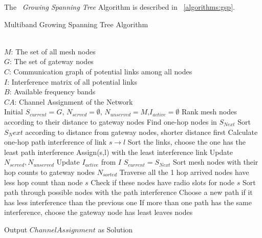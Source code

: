 The ~\emph{Growing Spanning Tree} Algorithm is described in ~\ref{algorithms:gsp}.







\begin{algorithm}
    \small
\caption{Multiband Growing Spanning Tree Algorithm}
\label{algorithms:gsp}
\begin{algorithmic}[1]
\REQUIRE  ~~\\
	 $M$: The set of all mesh nodes\\
	 $G$: The set of gateway nodes\\
	 $C$: Communication graph of potential links among all nodes\\
	 $I$: Interference matrix of all potential links \\
	 $B$: Available frequency bands
\ENSURE ~~\\    
$CA$: Channel Assignment of the Network\\
\STATE Initial $S_{current}=G$, $N_{served}=\emptyset$, $N_{unserved}=M$,$I_{active}=\emptyset$
\STATE Rank mesh nodes according to their distance to gateway nodes
	\STATE Find one-hop nodes in $S_{Next}$
	\STATE Sort $S_Next$ according to distance from gateway nodes, shorter distance first
		\STATE Calculate one-hop path interference of link $s\rightarrow l$
		\STATE Sort the links, choose the one has the least path interference
		\STATE Assign(s,l) with the least interference link
		\STATE Update $N_{served},N_{unserved}$
		\STATE Update $I_{active}$ from $I$
	\ENDFOR
	\STATE $S_{current}=S_{Next}$
\ENDFOR
\ENDWHILE
\STATE Sort mesh nodes with their hop counts to gateway nodes $N_{sorted}$
	\STATE Traverse all the 1 hop arrived nodes have less hop count than node $s$ 
	\STATE Check if these nodes have radio slots for node $s$
	\STATE Sort path through possible nodes with the path interference
	\STATE Choose a new path if it has less interference than the previous one
	\STATE If more than one path has the same interference, choose the gateway node has least leaves nodes 
\ENDFOR
\ENDWHILE

Output $Channel Assignment$ as Solution
\end{algorithmic}
\end{algorithm}
      


